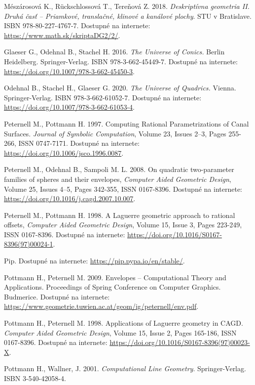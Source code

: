 \documentclass[12pt, twoside]{book}
\theoremstyle{definition}
\begin{document}
\begin{thebibliography}{99}
 Mészárosová K., Rückschlossová T., Tereňová Z. 2018. \textit{Deskriptívna geometria II. Druhá časť – Priamkové, translačné, klinové a kanálové plochy}. STU v Bratislave. ISBN 978-80-227-4767-7. Dostupné na internete: \url{https://www.math.sk/skriptaDG2/2/}.

 Glaeser G., Odehnal B., Stachel H. 2016. \textit{The Universe of Conics.} Berlin Heidelberg. Springer-Verlag. ISBN 978-3-662-45449-7. Dostupné na internete: \url{https://doi.org/10.1007/978-3-662-45450-3}.

 Odehnal B., Stachel H., Glaeser G. 2020. \textit{The Universe of Quadrics.} Vienna. Springer-Verlag. ISBN 978-3-662-61052-7. Dostupné na internete: \url{https://doi.org/10.1007/978-3-662-61053-4}.

 Peternell M., Pottmann H. 1997. Computing Rational Parametrizations of Canal Surfaces. \textit{Journal of Symbolic Computation}, Volume 23, Issues 2–3, Pages 255-266, ISSN 0747-7171. Dostupné na internete: \url{https://doi.org/10.1006/jsco.1996.0087}.

 Peternell M., Odehnal B., Sampoli M. L. 2008.
On quadratic two-parameter families of spheres and their envelopes, \textit{Computer Aided Geometric Design}, Volume 25, Issues 4–5, Pages 342-355, ISSN 0167-8396. Dostupné na internete: \url{https://doi.org/10.1016/j.cagd.2007.10.007}.

 Peternell M., Pottmann H. 1998. A Laguerre geometric approach to rational offsets, \textit{Computer Aided Geometric Design},
Volume 15, Issue 3, Pages 223-249, ISSN 0167-8396. Dostupné na internete: \url{https://doi.org/10.1016/S0167-8396(97)00024-1}.

 Pip. Dostupné na internete: \url{https://pip.pypa.io/en/stable/}.

 Pottmann H., Peternell M. 2009. Envelopes – Computational Theory and Applications. Proceedings of Spring Conference on Computer Graphics. Budmerice. Dostupné na internete: \url{https://www.geometrie.tuwien.ac.at/geom/ig/peternell/env.pdf}.

 Pottmann H., Peternell M. 1998. Applications of Laguerre geometry in CAGD. \textit{Computer Aided Geometric Design}, Volume 15, Issue 2, Pages 165-186, ISSN 0167-8396. Dostupné na internete: \url{https://doi.org/10.1016/S0167-8396(97)00023-X}.

 Pottmann H., Wallner, J. 2001. \textit{Computational Line Geometry}. Springer-Verlag. ISBN 3-540-42058-4.


\end{thebibliography}
\end{document}
